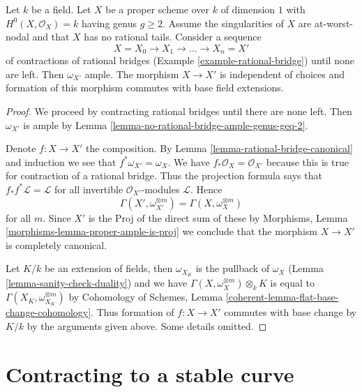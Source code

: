 \begin{lemma}
\label{lemma-contracting-rational-bridges}
Let $k$ be a field. Let $X$ be a proper scheme over $k$ of dimension $1$
with $H^0(X, \mathcal{O}_X) = k$ having genus $g \geq 2$.
Assume the singularities of $X$ are at-worst-nodal and that
$X$ has no rational tails. Consider a sequence
$$
X = X_0 \to X_1 \to \ldots \to X_n = X'
$$
of contractions of rational bridges
(Example \ref{example-rational-bridge}) until none are left.
Then $\omega_{X'}$ ample.
The morphism $X \to X'$ is independent of choices and
formation of this morphism commutes with base field extensions.
\end{lemma}

\begin{proof}
We proceed by contracting rational bridges until there are none
left. Then $\omega_{X'}$ is ample by
Lemma \ref{lemma-no-rational-bridge-ample-genus-geq-2}.

\medskip\noindent
Denote $f : X \to X'$ the composition. By
Lemma \ref{lemma-rational-bridge-canonical} and induction we see that
$f^*\omega_{X'} = \omega_X$.
We have $f_*\mathcal{O}_X = \mathcal{O}_{X'}$
because this is true for contraction of a rational bridge.
Thus the projection formula says that
$f_*f^*\mathcal{L} = \mathcal{L}$ for all invertible
$\mathcal{O}_{X'}$-modules $\mathcal{L}$.
Hence
$$
\Gamma(X', \omega_{X'}^{\otimes m}) = \Gamma(X, \omega_X^{\otimes m})
$$
for all $m$. Since $X'$ is the Proj of the direct sum of these
by Morphisms, Lemma \ref{morphisms-lemma-proper-ample-is-proj}
we conclude that the morphism $X \to X'$ is completely canonical.

\medskip\noindent
Let $K/k$ be an extension of fields, then
$\omega_{X_K}$ is the pullback of $\omega_X$
(Lemma \ref{lemma-sanity-check-duality}) and we have
$\Gamma(X, \omega_X^{\otimes m}) \otimes_k K$
is equal to
$\Gamma(X_K, \omega_{X_K}^{\otimes m})$
by
Cohomology of Schemes, Lemma \ref{coherent-lemma-flat-base-change-cohomology}.
Thus formation of $f : X \to X'$ commutes with base change by
$K/k$ by the arguments given above. Some details omitted.
\end{proof}






\section{Contracting to a stable curve}
\label{section-contracting-to-stable}

